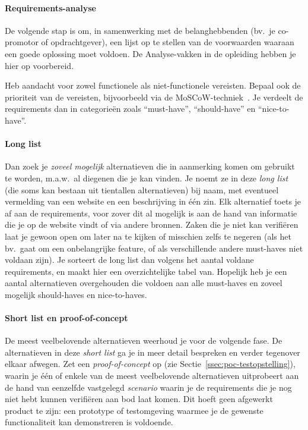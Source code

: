 \paragraph{Requirements-analyse}%

De volgende stap is om, in samenwerking met de belanghebbenden (bv.~je co-promotor of opdrachtgever), een lijst op te stellen van de voorwaarden waaraan een goede oplossing moet voldoen. De Analyse-vakken in de opleiding hebben je hier op voorbereid.

Heb aandacht voor zowel functionele als niet-functionele vereisten. Bepaal ook de prioriteit van de vereisten, bijvoorbeeld via de MoSCoW-techniek~\autocite{Nordenstam2014}. Je verdeelt de requirements dan in categorieën zoals ``must-have'', ``should-have'' en ``nice-to-have''.

\paragraph{Long list}%

Dan zoek je \emph{zoveel mogelijk} alternatieven die in aanmerking komen om gebruikt te worden, m.a.w.~al diegenen die je kan vinden. Je noemt ze in deze \emph{long list} (die soms kan bestaan uit tientallen alternatieven) bij naam, met eventueel vermelding van een website en een beschrijving in één zin. Elk alternatief toets je af aan de requirements, voor zover dit al mogelijk is aan de hand van informatie die je op de website vindt of via andere bronnen. Zaken die je niet kan verifiëren laat je gewoon open om later na te kijken of misschien zelfs te negeren (als het bv.~gaat om een onbelangrijke feature, of als verschillende andere must-haves niet voldaan zijn). Je sorteert de long list dan volgens het aantal voldane requirements, en maakt hier een overzichtelijke tabel van. Hopelijk heb je een aantal alternatieven overgehouden die voldoen aan alle must-haves en zoveel mogelijk should-haves en nice-to-haves.

\paragraph{Short list en proof-of-concept}%

 De meest veelbelovende alternatieven weerhoud je voor de volgende fase. De alternatieven in deze \emph{short list} ga je in meer detail bespreken en verder tegenover elkaar afwegen. Zet een \emph{proof-of-concept} op (zie Sectie~\ref{ssec:poc-testopstelling}), waarin je één of enkele van de meest veelbelovende alternatieven uitprobeert aan de hand van eenzelfde vastgelegd \emph{scenario} waarin je de requirements die je nog niet hebt kunnen verifiëren aan bod laat komen. Dit hoeft geen afgewerkt product te zijn: een prototype of testomgeving waarmee je de gewenste functionaliteit kan demonstreren is voldoende.

